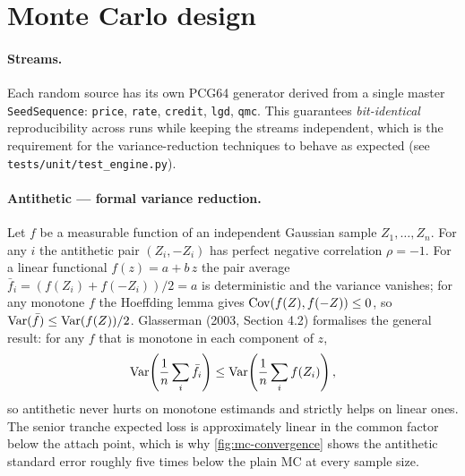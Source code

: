 \section{Monte Carlo design}\label{sec:monte_carlo}

\paragraph{Streams.} Each random source has its own PCG64 generator derived
from a single master \texttt{SeedSequence}: \texttt{price}, \texttt{rate},
\texttt{credit}, \texttt{lgd}, \texttt{qmc}. This guarantees
\emph{bit-identical} reproducibility across runs while keeping the streams
independent, which is the requirement for the variance-reduction
techniques to behave as expected (see
\texttt{tests/unit/test\_engine.py}).

\paragraph{Antithetic — formal variance reduction.}
Let $f$ be a measurable function of an independent Gaussian sample
$Z_1, \ldots, Z_n$. For any $i$ the antithetic pair $(Z_i, -Z_i)$ has
perfect negative correlation $\rho = -1$. For a linear functional
$f(z) = a + b\,z$ the pair average $\bar f_i = (f(Z_i) + f(-Z_i))/2 = a$
is deterministic and the variance vanishes; for any monotone $f$ the
Hoeffding lemma gives $\operatorname{Cov}(f(Z), f(-Z)) \le 0$, so $\operatorname{Var}(\bar f) \le
\operatorname{Var}(f(Z))/2$. Glasserman (2003, Section 4.2) formalises the general
result: for any $f$ that is monotone in each component of $z$,
\begin{equation*}
\operatorname{Var}\!\left(\frac{1}{n}\sum_i \bar f_i\right) \le \operatorname{Var}\!\left(\frac{1}{n}\sum_i f(Z_i)\right),
\end{equation*}
so antithetic never hurts on monotone estimands and strictly helps on
linear ones. The senior tranche expected loss is approximately linear
in the common factor below the attach point, which is why
\cref{fig:mc-convergence} shows the antithetic standard error roughly
five times below the plain MC at every sample size.

